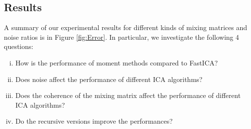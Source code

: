 \documentclass[11pt]{article}
\begin{document}
\subsection{Results}
\label{subsubsec:ICAresults}
A summary of our experimental results for different kinds of mixing matrices and noise ratios is in Figure \ref{fig:Error}.
In particular, we investigate the following 4 questions:
\begin{enumerate}[(i)]
	\vspace{-2mm}
	\itemsep-.5em
	\item How is the performance of moment methods compared to FastICA? 
	\item Does noise affect the performance of different ICA algorithms?
	\item Does the coherence of the mixing matrix affect the performance of different ICA algorithms?
	\item Do the recursive versions improve the performances?
\end{enumerate}
\end{document}
